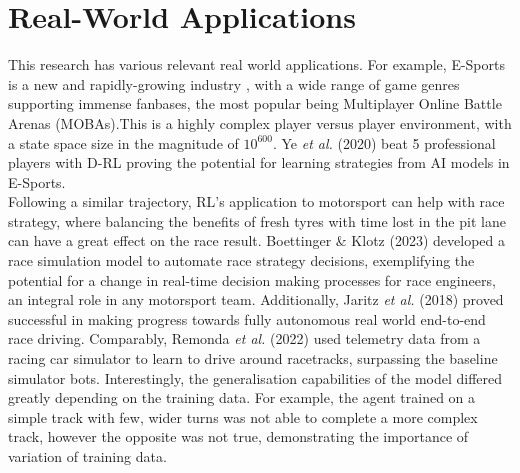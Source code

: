 \section{Real-World Applications}
This research has various relevant real world applications. For example, E-Sports is a new and rapidly-growing industry \cite{block2021esports}, with a wide range of game genres supporting immense fanbases, the most popular being Multiplayer Online Battle Arenas (MOBAs).This is a highly complex player versus player environment, with a state space size in the magnitude of $10^{600}$. Ye \textit{et al.} (2020) \cite{ye2020mastering} beat 5 professional players with D-RL proving the potential for learning strategies from AI models in E-Sports.\\ Following a similar trajectory, RL's application to motorsport can help with race strategy, where balancing the benefits of fresh tyres with time lost in the pit lane can have a great effect on the race result. Boettinger \& Klotz (2023) \cite{boettinger2023mastering} developed a race simulation model to automate race strategy decisions, exemplifying the potential for a change in real-time decision making processes for race engineers, an integral role in any motorsport team. Additionally, Jaritz \textit{et al.} (2018) \cite{jaritz2018end} proved successful in making progress towards fully autonomous real world end-to-end race driving. Comparably, Remonda \textit{et al.} (2022) \cite{remonda2021formula} used telemetry data from a racing car simulator to learn to drive around racetracks, surpassing the baseline simulator bots. Interestingly, the generalisation capabilities of the model differed greatly depending on the training data. For example, the agent trained on a simple track with few, wider turns was not able to complete a more complex track, however the opposite was not true, demonstrating the importance of variation of training data.
